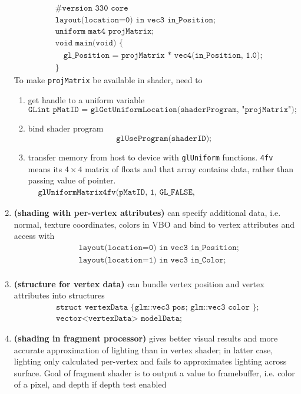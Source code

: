 \documentclass[11pt]{article}
\newcommand{\bheading}[1]{\textbf{(#1)}}
\begin{document}
\begin{enumerate}
    \begin{align*}
        &\texttt{\#version 330 core} \\
        &\texttt{layout(location=0) in vec3 in\_Position;} \\
        &\texttt{uniform mat4 projMatrix;} \\
        &\texttt{void main(void) \{ } \\
        &\quad\texttt{gl\_Position = projMatrix * vec4(in\_Position, 1.0);} \\
        &\texttt{\} }
    \end{align*}
    To make \texttt{projMatrix} be available in shader, need to 
    \begin{enumerate}
        \item get handle to a uniform variable
        \[
            \texttt{GLint pMatID = glGetUniformLocation(shaderProgram, "projMatrix");}    
        \]
        \item bind shader program
        \[
           \texttt{ glUseProgram(shaderID);}
        \]
        \item transfer memory from host to device with \texttt{glUniform} functions. \texttt{4fv} means its $4\times 4$ matrix of floats and that array contains data, rather than passing value of pointer.
        \begin{align*}
            &\texttt{glUniformMatrix4fv(pMatID, 1, GL\_FALSE, glm::value\_ptr(projMatrix)); }
        \end{align*}
    \end{enumerate}
    \item \bheading{shading with per-vertex attributes} can specify additional data, i.e. normal, texture coordinates, colors in VBO and bind to vertex attributes and access with 
    \begin{align*}
        &\texttt{layout(location=0) in vec3 in\_Position;} \\
        &\texttt{layout(location=1) in vec3 in\_Color;} \\
    \end{align*}
    \item \bheading{structure for vertex data} can bundle vertex position and vertex attributes into structures
    \begin{align*}
        &\texttt{struct vertexData \{ glm::vec3 pos; glm::vec3 color \}; } \\ 
        &\texttt{vector<vertexData> modelData;}
    \end{align*}
    \item \bheading{shading in fragment processor} gives better visual results and more accurate approximation of lighting than in vertex shader; in latter case, lighting only calculated per-vertex and fails to approximates lighting across surface. Goal of fragment shader is to output a value to framebuffer, i.e. color of a pixel, and depth if depth test enabled

\end{enumerate}
\end{document}
